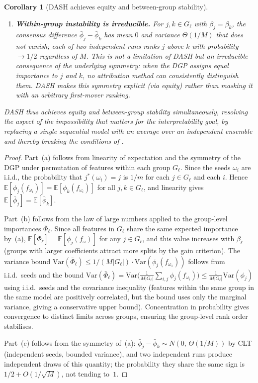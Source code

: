 \documentclass[11pt]{article}
\newtheorem{corollary}[theorem]{Corollary}
\theoremstyle{remark}
\newcommand{\Gl}{G_\ell}                    %
\newcommand{\phij}{\phi_j}                  %
\newcommand{\phik}{\phi_k}                  %
\newcommand{\Exp}{\mathbb{E}}              %
\newcommand{\Var}{\mathrm{Var}}            %
\newcommand{\dash}{\textsc{DASH}}
\begin{document}
\begin{corollary}[\dash{} achieves equity and between-group stability]
\begin{enumerate}
  \item[(c)] \textbf{Within-group instability is irreducible.}
    For $j, k \in G_\ell$ with $\beta_j = \beta_k$,
    the consensus difference $\bar\phi_j - \bar\phi_k$ has mean $0$
    and variance $\Theta(1/M)$ that does not vanish; each of two
    independent runs ranks $j$ above $k$ with probability
    $\to 1/2$ regardless of $M$.  This is not a limitation of \dash{}
    but an irreducible consequence of the underlying symmetry: when the
    DGP assigns equal importance to $j$ and $k$, no attribution method
    can consistently distinguish them.  \dash{} makes this symmetry
    explicit (via equity) rather than masking it with an arbitrary
    first-mover ranking.
\end{enumerate}
\dash{} thus achieves equity and between-group stability simultaneously,
resolving the aspect of the impossibility that matters for the
interpretability goal, by replacing a single sequential model with an
average over an independent ensemble and thereby breaking the conditions
of .
\end{corollary}

\begin{proof}
Part~(a) follows from linearity of expectation and the symmetry of the
DGP under permutation of features within each group $\Gl$.  Since the
seeds $\omega_i$ are i.i.d., the probability that $j^*(\omega_i) = j$
is $1/m$ for each $j \in \Gl$ and each $i$.  Hence
$\Exp[\phij(f_{\omega_i})] = \Exp[\phik(f_{\omega_i})]$ for all
$j, k \in \Gl$, and linearity gives
$\Exp[\bar{\phi}_j] = \Exp[\bar{\phi}_k]$.

Part~(b) follows from the law of large numbers applied to
the group-level importances $\bar\Phi_\ell$.  Since all features in
$G_\ell$ share the same expected importance by~(a),
$\Exp[\bar\Phi_\ell] = \Exp[\phi_j(f_\omega)]$ for any $j\in G_\ell$,
and this value increases with $\beta_\ell$ (groups with larger coefficients
attract more splits by the gain criterion).  The variance bound
$\Var(\bar\Phi_\ell) \leq 1/(M|G_\ell|)\cdot\Var(\phi_j(f_{\omega_1}))$
follows from i.i.d.\ seeds and the bound
$\Var(\bar\Phi_\ell) = \Var\bigl(\frac{1}{M|G_\ell|}\sum_{i,j}\phi_j(f_{\omega_i})\bigr)
\leq \frac{1}{M|G_\ell|}\Var(\phi_j)$
using i.i.d.\ seeds and the covariance inequality
(features within the same group in the same model are positively
correlated, but the bound uses only the marginal variance, giving a
conservative upper bound).
Concentration in probability gives convergence to distinct
limits across groups, ensuring the group-level rank order stabilises.

Part~(c) follows from the symmetry of~(a): $\bar\phi_j - \bar\phi_k \sim
N(0,\,\Theta(1/M))$ by CLT (independent seeds, bounded variance), and two
independent runs produce independent draws of this quantity; the probability
they share the same sign is $1/2 + O(1/\sqrt{M})$, not tending to~$1$.
\end{proof}
\end{document}
